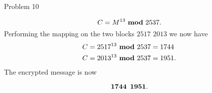 \begin{problem}{Problem 10}
\begin{highlight}[Solution]
        \begin{equation}
            C = M^{13} \text{ \textbf{mod} } 2537.
        \end{equation}
        Performing the mapping on the two blocks $\text{2517 2013}$ we now have
        \begin{align}
            C & = 2517^{13} \text{ \textbf{mod} } 2537 = 1744 \\
            C & = 2013^{13} \text{ \textbf{mod} } 2537 = 1951.
        \end{align}
        The encrypted message is now

        \begin{equation}
            \mathbf{1744} \hspace*{5pt} \mathbf{1951}.
        \end{equation}
    \end{highlight}
\end{problem}

